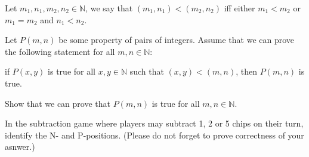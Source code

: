 \documentclass[addpoints]{exam}
\begin{document}
  \pagestyle{headandfoot}
  \runningheadrule

  \firstpagefooter{}{}{}
  \runningfooter{}{}{}
  \begin{flushright}

    \vspace{0.2in}
  \end{flushright}

  \begin{questions}
    \question[10]
      Let $m_1, n_1, m_2, n_2 \in \mathbb{N}$, we say that $(m_1, n_1) < (m_2, n_2)$
			iff either $m_1 < m_2$ or $m_1 = m_2$ and $n_1 < n_2$.
			
			Let $P(m, n)$ be some property of pairs of integers. Assume that we can prove
			the following statement for all $m, n \in \mathbb{N}$:
			\begin{center}
			  if $P(x, y)$ is true for all $x, y \in \mathbb{N}$ such that 
			  $(x, y) < (m, n)$, then $P(m, n)$ is true.
			\end{center}
			Show that we can prove that $P(m, n)$ is true for all $m, n \in \mathbb{N}$.

      \begin{solution}[\stretch{1}]
      \end{solution}
      \newpage
    \question[10]
      In the subtraction game where players may subtract 1, 2 or 5 chips on their
			turn, identify the N- and P-positions.
			(Please do not forget to prove correctness of your asnwer.)

      \begin{solution}[\stretch{1}]
      \end{solution}
      \newpage
  \end{questions}
\end{document}
